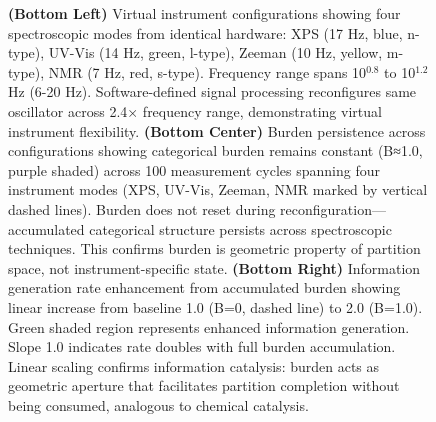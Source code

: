 \begin{figure}[htbp]
{    \textbf{(Bottom Left)} Virtual instrument configurations showing four spectroscopic modes from identical hardware: XPS (17 Hz, blue, n-type), UV-Vis (14 Hz, green, l-type), Zeeman (10 Hz, yellow, m-type), NMR (7 Hz, red, s-type). Frequency range spans 10$^{0.8}$ to 10$^{1.2}$ Hz (6-20 Hz). Software-defined signal processing reconfigures same oscillator across 2.4× frequency range, demonstrating virtual instrument flexibility. 
    \textbf{(Bottom Center)} Burden persistence across configurations showing categorical burden remains constant (B≈1.0, purple shaded) across 100 measurement cycles spanning four instrument modes (XPS, UV-Vis, Zeeman, NMR marked by vertical dashed lines). Burden does not reset during reconfiguration—accumulated categorical structure persists across spectroscopic techniques. This confirms burden is geometric property of partition space, not instrument-specific state. 
    \textbf{(Bottom Right)} Information generation rate enhancement from accumulated burden showing linear increase from baseline 1.0 (B=0, dashed line) to 2.0 (B=1.0). Green shaded region represents enhanced information generation. Slope 1.0 indicates rate doubles with full burden accumulation. Linear scaling confirms information catalysis: burden acts as geometric aperture that facilitates partition completion without being consumed, analogous to chemical catalysis.}
    \label{fig:autocatalytic_dynamics}
\end{figure}

